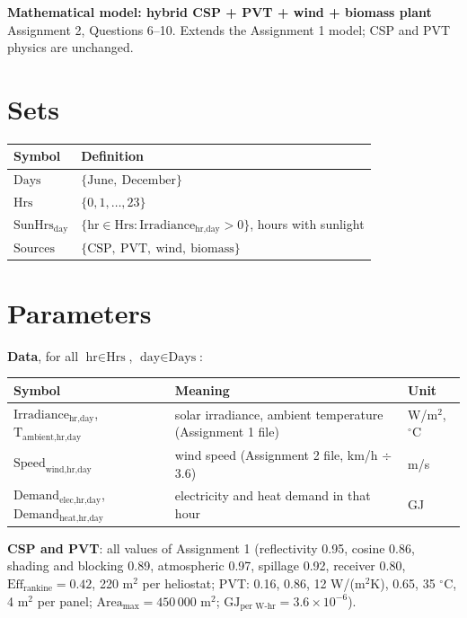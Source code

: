 \documentclass[11pt,a4paper]{article}
\newcommand{\T}[1]{\text{#1}}
\begin{document}
{\Large\bfseries Mathematical model: hybrid CSP + PVT + wind + biomass plant}\\[2pt]
{\small Assignment 2, Questions 6--10. Extends the Assignment 1 model; CSP and PVT physics are unchanged.}
\vspace{6pt}

\section{Sets}
\begin{tabular}{@{}ll@{}}
\toprule
Symbol & Definition\\\midrule
$\T{Days}$ & $\{\T{June},\ \T{December}\}$\\
$\T{Hrs}$ & $\{0,1,\dots,23\}$\\
$\T{SunHrs}_{\T{day}}$ & $\{\T{hr}\in\T{Hrs} : \T{Irradiance}_{\T{hr,day}}>0\}$, hours with sunlight\\
$\T{Sources}$ & $\{\T{CSP},\ \T{PVT},\ \T{wind},\ \T{biomass}\}$\\
\bottomrule
\end{tabular}

\section{Parameters}
\textbf{Data}, for all $\T{hr}\in\T{Hrs}$, $\T{day}\in\T{Days}$:\\[2pt]
\begin{tabular}{@{}p{}p{}p{}@{}}
\toprule
Symbol & Meaning & Unit\\\midrule
$\T{Irradiance}_{\T{hr,day}}$, $\T{T}_{\T{ambient,hr,day}}$ & solar irradiance, ambient temperature (Assignment 1 file) & W/m$^2$, $^\circ$C\\
$\T{Speed}_{\T{wind,hr,day}}$ & wind speed (Assignment 2 file, km/h $\div$ 3.6) & m/s\\
$\T{Demand}_{\T{elec,hr,day}}$, $\T{Demand}_{\T{heat,hr,day}}$ & electricity and heat demand in that hour & GJ\\
\bottomrule
\end{tabular}

\vspace{6pt}\textbf{CSP and PVT}: all values of Assignment 1 (reflectivity 0.95, cosine 0.86, shading and blocking 0.89, atmospheric 0.97, spillage 0.92, receiver 0.80, $\T{Eff}_{\T{rankine}}=0.42$, 220 m$^2$ per heliostat; PVT: 0.16, 0.86, 12 W/(m$^2$K), 0.65, 35 $^\circ$C, 4 m$^2$ per panel; $\T{Area}_{\T{max}}=450\,000$ m$^2$; $\T{GJ}_{\T{per W-hr}}=3.6\times10^{-6}$).
\end{document}
